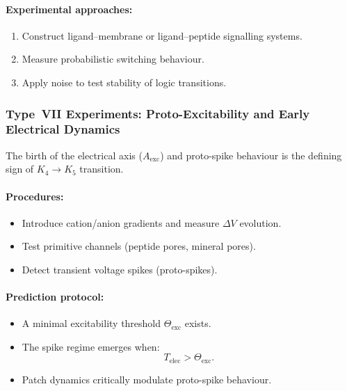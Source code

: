 \paragraph{Experimental approaches:}

\begin{enumerate}
    \item Construct ligand–membrane or ligand–peptide signalling systems.
    \item Measure probabilistic switching behaviour.
    \item Apply noise to test stability of logic transitions.
\end{enumerate}



\subsubsection{Type~VII Experiments: Proto-Excitability and Early Electrical Dynamics}

The birth of the electrical axis ($A_{\mathrm{exc}}$) and proto-spike
behaviour is the defining sign of $K_4 \rightarrow K_5$ transition.

\paragraph{Procedures:}

\begin{itemize}
    \item Introduce cation/anion gradients and measure $\Delta V$ evolution.
    \item Test primitive channels (peptide pores, mineral pores).
    \item Detect transient voltage spikes (proto-spikes).
\end{itemize}

\paragraph{Prediction protocol:}

\begin{itemize}
    \item A minimal excitability threshold $\Theta_{\mathrm{exc}}$ exists.
    \item The spike regime emerges when:
          \[
              T_{\mathrm{elec}} > \Theta_{\mathrm{exc}}.
          \]
    \item Patch dynamics critically modulate proto-spike behaviour.
\end{itemize}



